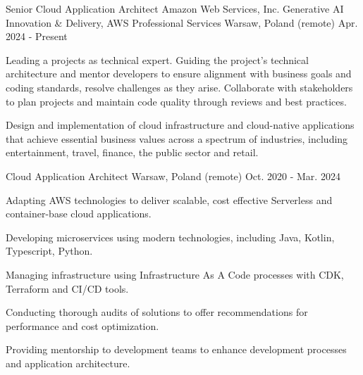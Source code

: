 
\begin{cventries}

  \cventry
    {Senior Cloud Application Architect} %
    {Amazon Web Services, Inc. \break Generative AI Innovation \& Delivery, AWS Professional Services} %
    {Warsaw, Poland (remote)} %
    {Apr. 2024 - Present} %
    {
      \begin{cvitems} %
       \item {Leading a projects as technical expert. Guiding the project’s technical architecture and mentor developers to ensure alignment with business goals and coding standards, resolve challenges as they arise. Collaborate with stakeholders to plan projects and maintain code quality through reviews and best practices.}
       \item {Design and implementation of cloud infrastructure and cloud-native applications that achieve essential business values across a spectrum of industries, including entertainment, travel, finance, the public sector and retail.}
      \end{cvitems}
    }


  \cventry
    {Cloud Application Architect} %
    {} %
    {Warsaw, Poland (remote)} %
    {Oct. 2020 - Mar. 2024} %
    {
      \begin{cvitems} %
       \item {Adapting AWS technologies to deliver scalable, cost effective Serverless and container-base cloud applications.}
       \item {Developing microservices using modern technologies, including Java, Kotlin, Typescript, Python. }
       \item {Managing infrastructure using Infrastructure As A Code processes with CDK, Terraform and CI/CD tools.}
       \item {Conducting thorough audits of solutions to offer recommendations for performance and cost optimization.}
       \item {Providing mentorship to development teams to enhance development processes and application architecture.}
      \end{cvitems}
    }


\end{cventries}
